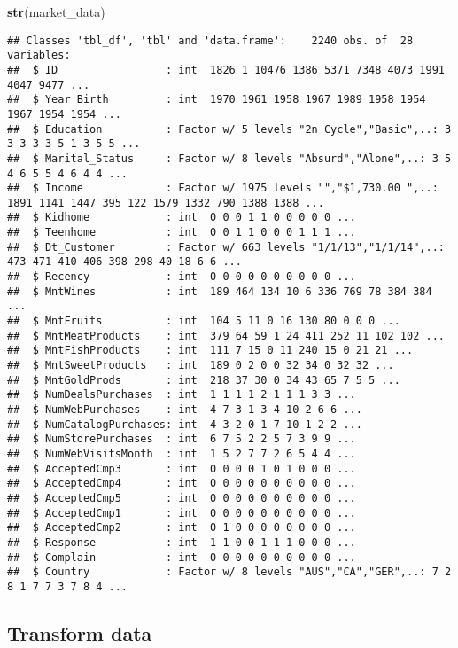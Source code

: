 \documentclass[]{article}
\newenvironment{Shaded}{\begin{snugshade}}{\end{snugshade}}
\newcommand{\KeywordTok}[1]{\textcolor[rgb]{0.13,0.29,0.53}{\textbf{#1}}}
\newcommand{\NormalTok}[1]{#1}
\begin{document}
\begin{Shaded}
\begin{Highlighting}[]
\KeywordTok{str}\NormalTok{(market_data)}
\end{Highlighting}
\end{Shaded}

\begin{verbatim}
## Classes 'tbl_df', 'tbl' and 'data.frame':    2240 obs. of  28 variables:
##  $ ID                 : int  1826 1 10476 1386 5371 7348 4073 1991 4047 9477 ...
##  $ Year_Birth         : int  1970 1961 1958 1967 1989 1958 1954 1967 1954 1954 ...
##  $ Education          : Factor w/ 5 levels "2n Cycle","Basic",..: 3 3 3 3 3 5 1 3 5 5 ...
##  $ Marital_Status     : Factor w/ 8 levels "Absurd","Alone",..: 3 5 4 6 5 5 4 6 4 4 ...
##  $ Income             : Factor w/ 1975 levels "","$1,730.00 ",..: 1891 1141 1447 395 122 1579 1332 790 1388 1388 ...
##  $ Kidhome            : int  0 0 0 1 1 0 0 0 0 0 ...
##  $ Teenhome           : int  0 0 1 1 0 0 0 1 1 1 ...
##  $ Dt_Customer        : Factor w/ 663 levels "1/1/13","1/1/14",..: 473 471 410 406 398 298 40 18 6 6 ...
##  $ Recency            : int  0 0 0 0 0 0 0 0 0 0 ...
##  $ MntWines           : int  189 464 134 10 6 336 769 78 384 384 ...
##  $ MntFruits          : int  104 5 11 0 16 130 80 0 0 0 ...
##  $ MntMeatProducts    : int  379 64 59 1 24 411 252 11 102 102 ...
##  $ MntFishProducts    : int  111 7 15 0 11 240 15 0 21 21 ...
##  $ MntSweetProducts   : int  189 0 2 0 0 32 34 0 32 32 ...
##  $ MntGoldProds       : int  218 37 30 0 34 43 65 7 5 5 ...
##  $ NumDealsPurchases  : int  1 1 1 1 2 1 1 1 3 3 ...
##  $ NumWebPurchases    : int  4 7 3 1 3 4 10 2 6 6 ...
##  $ NumCatalogPurchases: int  4 3 2 0 1 7 10 1 2 2 ...
##  $ NumStorePurchases  : int  6 7 5 2 2 5 7 3 9 9 ...
##  $ NumWebVisitsMonth  : int  1 5 2 7 7 2 6 5 4 4 ...
##  $ AcceptedCmp3       : int  0 0 0 0 1 0 1 0 0 0 ...
##  $ AcceptedCmp4       : int  0 0 0 0 0 0 0 0 0 0 ...
##  $ AcceptedCmp5       : int  0 0 0 0 0 0 0 0 0 0 ...
##  $ AcceptedCmp1       : int  0 0 0 0 0 0 0 0 0 0 ...
##  $ AcceptedCmp2       : int  0 1 0 0 0 0 0 0 0 0 ...
##  $ Response           : int  1 1 0 0 1 1 1 0 0 0 ...
##  $ Complain           : int  0 0 0 0 0 0 0 0 0 0 ...
##  $ Country            : Factor w/ 8 levels "AUS","CA","GER",..: 7 2 8 1 7 7 3 7 8 4 ...
\end{verbatim}

\hypertarget{transform-data}{%
\subsection{Transform data}\label{transform-data}}
\end{document}
